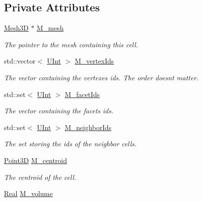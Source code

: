 \subsection*{Private Attributes}
\begin{DoxyCompactItemize}
\item 
\hyperlink{classFVCode3D_1_1Mesh3D}{Mesh3D} $\ast$ \hyperlink{classFVCode3D_1_1Mesh3D_1_1Cell3D_a5f593479ad61eb1a043b7ec977db39bb}{M\+\_\+mesh}
\begin{DoxyCompactList}\small\item\em The pointer to the mesh containing this cell. \end{DoxyCompactList}\item 
std\+::vector$<$ \hyperlink{namespaceFVCode3D_a4bf7e328c75d0fd504050d040ebe9eda}{U\+Int} $>$ \hyperlink{classFVCode3D_1_1Mesh3D_1_1Cell3D_a1c43369fa1a00208ff3293aad35a70aa}{M\+\_\+vertex\+Ids}
\begin{DoxyCompactList}\small\item\em The vector containing the vertexes ids. The order doesn\textquotesingle{}t matter. \end{DoxyCompactList}\item 
std\+::set$<$ \hyperlink{namespaceFVCode3D_a4bf7e328c75d0fd504050d040ebe9eda}{U\+Int} $>$ \hyperlink{classFVCode3D_1_1Mesh3D_1_1Cell3D_a1aa6b2a5119a2b94946f9a7dcfcb9478}{M\+\_\+facet\+Ids}
\begin{DoxyCompactList}\small\item\em The vector containing the facets ids. \end{DoxyCompactList}\item 
std\+::set$<$ \hyperlink{namespaceFVCode3D_a4bf7e328c75d0fd504050d040ebe9eda}{U\+Int} $>$ \hyperlink{classFVCode3D_1_1Mesh3D_1_1Cell3D_ab05458f242974547b2657d0806fc3daa}{M\+\_\+neighbor\+Ids}
\begin{DoxyCompactList}\small\item\em The set storing the ids of the neighbor cells. \end{DoxyCompactList}\item 
\hyperlink{classFVCode3D_1_1Point3D}{Point3D} \hyperlink{classFVCode3D_1_1Mesh3D_1_1Cell3D_a85077932a074f0903d085f9d33a13e09}{M\+\_\+centroid}
\begin{DoxyCompactList}\small\item\em The centroid of the cell. \end{DoxyCompactList}\item 
\hyperlink{namespaceFVCode3D_a40c1f5588a248569d80aa5f867080e83}{Real} \hyperlink{classFVCode3D_1_1Mesh3D_1_1Cell3D_a7616a6d28fcd8013bc52f4d754569e60}{M\+\_\+volume}

\end{DoxyCompactItemize}
